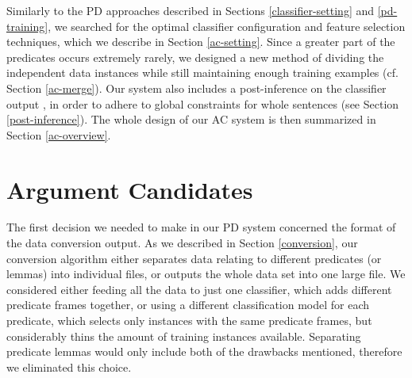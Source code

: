 \documentclass[12pt,notitlepage]{report}
\begin{document}
Similarly to the PD approaches described in Sections \ref{classifier-setting} and \ref{pd-training}, we searched for the optimal classifier configuration and feature selection techniques, which we describe in Section \ref{ac-setting}. Since a greater part of the predicates occurs extremely rarely, we designed a new method of dividing the independent data instances while still maintaining enough training examples (cf. Section \ref{ac-merge}). Our system also includes a post-inference on the classifier output \citep{punyakanok04}, in order to adhere to global constraints for whole sentences (see Section \ref{post-inference}). The whole design of our AC system is then summarized in Section \ref{ac-overview}.

\section{Argument Candidates}\label{pruning}

The first decision we needed to make in our PD system concerned the format of the data conversion output. As we described in Section \ref{conversion}, our conversion algorithm either separates data relating to different predicates (or lemmas) into individual files, or outputs the whole data set into one large file. We considered either feeding all the data to just one classifier, which adds different predicate frames together, or using a different classification model for each predicate, which selects only instances with the same predicate frames, but considerably thins the amount of training instances available. Separating predicate lemmas would only include both of the drawbacks mentioned, therefore we eliminated this choice.
\end{document}
